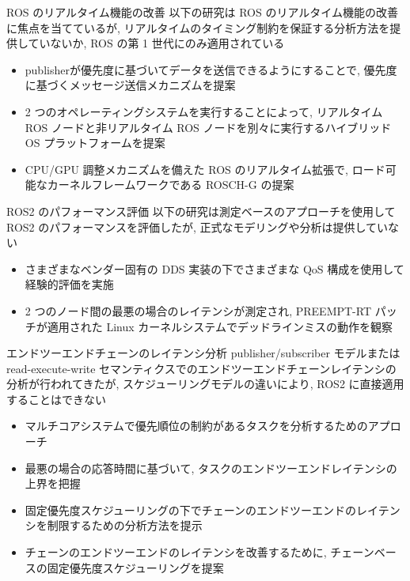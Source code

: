 \begin{frame}{ROS のリアルタイム機能の改善}
    以下の研究は ROS のリアルタイム機能の改善に焦点を当てているが, リアルタイムのタイミング制約を保証する分析方法を提供していないか, ROS の第 1 世代にのみ適用されている
    \begin{itemize}
        \item publisherが優先度に基づいてデータを送信できるようにすることで, 優先度に基づくメッセージ送信メカニズムを提案 \cite{saito2016priority}
        \item 2 つのオペレーティングシステムを実行することによって, リアルタイム ROS ノードと非リアルタイム ROS ノードを別々に実行するハイブリッド OS プラットフォームを提案 \cite{wei2016rt}
        \item CPU/GPU 調整メカニズムを備えた ROS のリアルタイム拡張で, ロード可能なカーネルフレームワークである ROSCH-G の提案 \cite{saito2018rosch}
    \end{itemize}
\end{frame}

\begin{frame}{ROS2 のパフォーマンス評価}
    以下の研究は測定ベースのアプローチを使用して ROS2 のパフォーマンスを評価したが, 正式なモデリングや分析は提供していない
    \begin{itemize}
        \item さまざまなベンダー固有の DDS 実装の下でさまざまな QoS 構成を使用して経験的評価を実施 \cite{maruyama2016exploring}
        \item 2 つのノード間の最悪の場合のレイテンシが測定され, PREEMPT-RT パッチが適用された Linux カーネルシステムでデッドラインミスの動作を観察 \cite{gutierrez2018towards}
    \end{itemize}
\end{frame}

\begin{frame}{エンドツーエンドチェーンのレイテンシ分析}
    publisher/subscriber モデルまたは read-execute-write セマンティクスでのエンドツーエンドチェーンレイテンシの分析が行われてきたが, スケジューリングモデルの違いにより, ROS2 に直接適用することはできない
    \setlength{\wideitemsep}{0.8\itemsep}
    {\footnotesize
        \begin{itemize}
            \item マルチコアシステムで優先順位の制約があるタスクを分析するためのアプローチ \cite{palencia1998schedulability, palencia1999exploiting}
            \item 最悪の場合の応答時間に基づいて, タスクのエンドツーエンドレイテンシの上界を把握 \cite{davare2007period, schlatow2016response}
            \item 固定優先度スケジューリングの下でチェーンのエンドツーエンドのレイテンシを制限するための分析方法を提示 \cite{koren1995skip, abdullah2019worst, becker2016synthesizing}
            \item チェーンのエンドツーエンドのレイテンシを改善するために, チェーンベースの固定優先度スケジューリングを提案  \cite{choi2020chain}
        \end{itemize}
    }
\end{frame}

